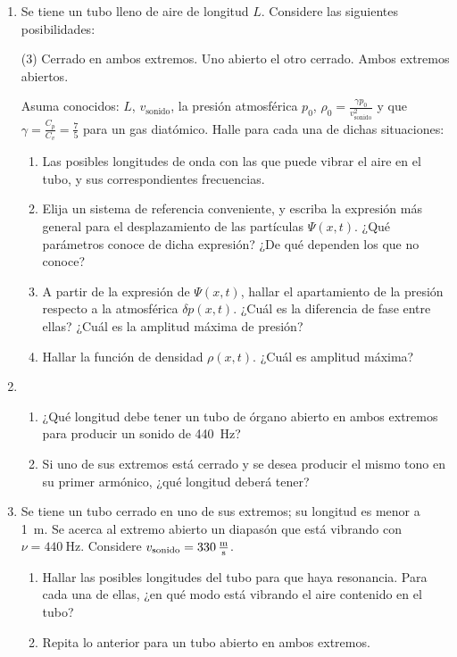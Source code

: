 \documentclass[11pt,spanish,a4paper]{article}
\begin{document}
\begin{enumerate}
\item Se tiene un tubo lleno de aire de longitud $L$. Considere las siguientes posibilidades: 
\begin{tasks}(3)
	\task Cerrado en ambos extremos.
	\task Uno abierto el otro cerrado.
	\task Ambos extremos abiertos.
\end{tasks}
Asuma conocidos: $L$, $v_\text{sonido}$, la presión atmosférica $p_0$, $\rho_{0}= \frac{ \gamma p_0 }{ v_\text{sonido}^2}$ y que $\gamma= \frac{C_p}{C_v}= \frac{7}{5}$ para un gas diatómico.
Halle para cada una de dichas situaciones: 
\begin{enumerate}
	\item Las posibles longitudes de onda con las que puede vibrar el aire en el tubo, y sus correspondientes frecuencias. 
	\item Elija un sistema de referencia conveniente, y escriba la expresión más general para el desplazamiento de las partículas $\Psi(x,t)$.
	¿Qué parámetros conoce de dicha expresión?
	¿De qué dependen los que no conoce? 
	\item A partir de la expresión de $\Psi(x,t)$, hallar el apartamiento de la presión respecto a la atmosférica $\delta p(x,t)$.
	¿Cuál es la diferencia de fase entre ellas?
	¿Cuál es la amplitud máxima de presión? 
	\item Hallar la función de densidad $\rho(x,t)$.
	¿Cuál es amplitud máxima?
\end{enumerate}


\item 
\begin{enumerate}
\item ¿Qué longitud debe tener un tubo de órgano abierto en ambos extremos para producir un sonido de \SI{440}{\hertz}? 
\item Si uno de sus extremos está cerrado y se desea producir el mismo tono en su primer armónico, ¿qué longitud deberá tener?
\end{enumerate}


\item Se tiene un tubo cerrado en uno de sus extremos; su longitud es menor a \SI{1}{\metre}.
Se acerca al extremo abierto un diapasón que está vibrando con $\nu = \SI{440}{\hertz}$.
Considere $v_\text{sonido} = \SI{330}{\metre\over\second}$.
\begin{enumerate}
	\item Hallar las posibles longitudes del tubo para que haya resonancia.
	Para cada una de ellas, ¿en qué modo está vibrando el aire contenido en el tubo? 
	\item Repita lo anterior para un tubo abierto en ambos extremos.
\end{enumerate}


\end{enumerate}
\end{document}
